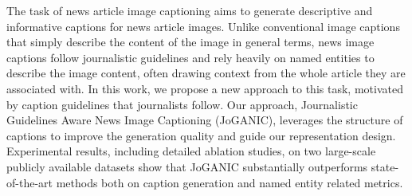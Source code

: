The task of news article image captioning aims to generate descriptive and informative captions for news article images. Unlike conventional image captions that simply describe the content of the image in general terms, news image captions follow journalistic guidelines and rely heavily on named entities to describe the image content, often drawing context from the whole article they are associated with. In this work, we propose a new approach to this task, motivated by caption guidelines that journalists follow. Our approach, Journalistic Guidelines Aware News Image Captioning (JoGANIC), leverages the structure of captions to improve the generation quality and guide our representation design. Experimental results, including detailed ablation studies, on two large-scale publicly available datasets show that JoGANIC substantially outperforms state-of-the-art methods both on caption generation and named entity related metrics.
